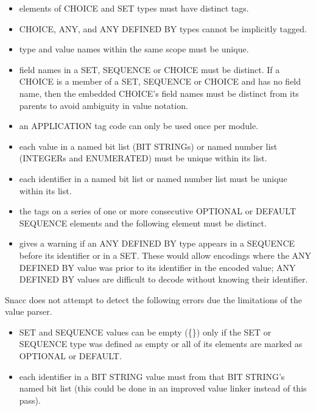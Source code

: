 \begin{itemize}
\item { elements of CHOICE and SET types must have distinct tags.}

\item { CHOICE, ANY, and ANY DEFINED BY types cannot be implicitly tagged. }

\item { type and value names within the same scope must be unique. }

\item { field names in a SET, SEQUENCE or CHOICE must be distinct.  If
a CHOICE is a member of a SET, SEQUENCE or CHOICE and has no field name,
then the embedded CHOICE's field names must be distinct from its
parents to avoid ambiguity in value notation.}

\item { an APPLICATION tag code can only be used once per module. }

\item { each value in a named bit list (BIT STRINGs) or named number
list (INTEGERs and ENUMERATED) must be unique within its list.}

\item { each identifier in a named bit list or named number list must
be unique within its list.}

\item { the tags on a series of one or more consecutive OPTIONAL or DEFAULT
SEQUENCE elements and the following element must be distinct. }

\item { gives a warning if an ANY DEFINED BY type appears in a
SEQUENCE before its identifier or in a SET\@.  These would allow encodings
where the ANY DEFINED BY value was prior to its identifier in the
encoded value; ANY DEFINED BY values are difficult to decode without
knowing their identifier.}

\end{itemize}

Snacc does not attempt to detect the following errors due the
limitations of the value parser.
\begin{itemize}
\item { SET and SEQUENCE values can be empty (\{\}) only if the SET or
SEQUENCE type was defined as empty or all of its elements are marked
as OPTIONAL or DEFAULT.}

\item { each identifier in a BIT STRING value must from that BIT
STRING's named bit list (this could be done in an improved value
linker instead of this pass).}
\end{itemize}


